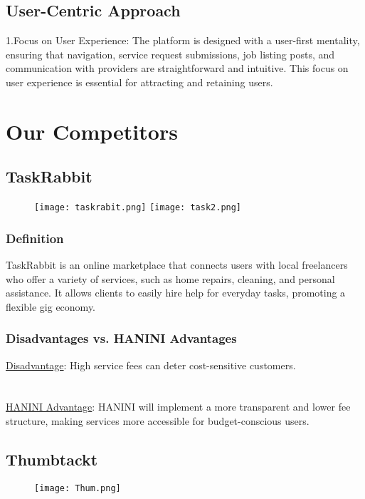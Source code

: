 \documentclass[12pt,a4paper]{report}
\begin{document}
\section{User-Centric Approach}
1.Focus on User Experience: The platform is designed with a user-first mentality, ensuring that navigation, service request submissions, job listing posts, and communication with providers are straightforward and intuitive. This focus on user experience is essential for attracting and retaining users.


\chapter{Our Competitors}
\section{TaskRabbit}
\begin{figure}[ht]
    \begin{center}
        \texttt{[image: taskrabit.png]}
         \texttt{[image: task2.png]}
     \end{center}
\end{figure}
\subsection*{Definition}
TaskRabbit is an online marketplace that connects users with local freelancers who offer a variety of services, such as home repairs, cleaning, and personal assistance. It allows clients to easily hire help for everyday tasks, promoting a flexible gig economy.
\subsection*{Disadvantages vs. HANINI Advantages}
\underline {Disadvantage}: High service fees can deter cost-sensitive customers.\\
\textbf{                      }\\
\textbf{                      }\\
\underline {HANINI Advantage}: HANINI will implement a more transparent and lower fee structure, making services more accessible for budget-conscious users.



\section{Thumbtackt}
\begin{figure}[ht]
    \begin{center}
        \texttt{[image: Thum.png]}
         
     \end{center}
\end{figure}
\end{document}
